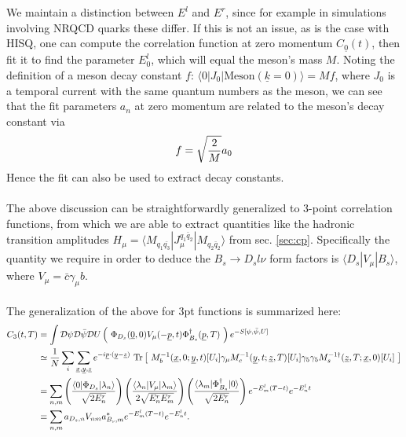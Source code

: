 \\ \\
We maintain a distinction between $E^l$ and $E^r$, since for example in simulations involving NRQCD quarks these differ. If this is not an issue, as is the case with HISQ, one can compute the correlation function at zero momentum $C_{\underline{0}}(t)$, then fit it to find the parameter $E^l_0$, which will equal the meson's mass $M$. Noting the definition of a meson decay constant $f$: $\langle 0 | J_0 | \text{Meson}(\underline{k}=0) \rangle = M f$, where $J_0$ is a temporal current with the same quantum numbers as the meson, we can see that the fit parameters $a_n$ at zero momentum are related to the meson's decay constant via
\begin{align}
	f = \sqrt{2\over M} a_0
\end{align}
Hence the fit can also be used to extract decay constants.
\\ \\
The above discussion can be straightforwardly generalized to 3-point correlation functions, from which we are able to extract quantities like the hadronic transition amplitudes $H_{\mu} = \langle M_{q_1\bar{q_3}} | J_{\mu}^{q_1\bar{q}_2} | M_{q_2\bar{q}_2} \rangle$ from sec. \ref{sec:cp}. Specifically the quantity we require in order to deduce the $B_{s}\to D_{s} l\nu$ form factors is $\langle D_{s} | V_{\mu} | B_{s} \rangle$, where $V_{\mu}=\bar{c}\gamma_{\mu} b$. 
\\ \\
The generalization of the above for 3pt functions is summarized here:
\begin{align}
	C_3(t,T) &= \int \mathcal{D}\psi \mathcal{D}\bar{\psi} \mathcal{D}U \left(\text{ } \Phi_{D_s}(\underline{0},0) V_{\mu}(-\underline{p},t) \Phi_{B_s}^{\dagger}(\underline{p},T) \text{ }\right) e^{-S[\psi,\bar{\psi},U]} \\
	&\simeq {1\over N} \sum_i \sum_{\underline{x},\underline{y},\underline{z}} e^{-i\underline{p}\cdot (\underline{y}-\underline{z})} \text{ Tr}\left[\text{ } M^{-1}_b(\underline{x},0;\underline{y},t)[U_i] \gamma_{\mu} M^{-1}_c(\underline{y},t;\underline{z},T)[U_i]\gamma_5\gamma_5 M_s^{-1\dagger}(\underline{z},T;\underline{x},0)[U_i]  \text{ }\right] \\	
	&= \sum_{n,m}  \left( {\langle 0 | \Phi_{D_s} | \lambda_n \rangle \over \sqrt{2E^r_n}} \right) \left({\langle \lambda_n | V_{\mu} | \lambda_m \rangle \over 2\sqrt{ E^r_n E^r_m } }\right) \left( {\langle \lambda_m | \Phi_{B_s}^{\dagger} | 0 \rangle \over \sqrt{2E^r_n} } \right) e^{-E^l_m (T-t)} e^{-E^l_n t} \\
	\nonumber
	& \equiv \sum_{n,m} a_{D_s,n} V_{nm} a^*_{B_s,m} e^{-E^l_m (T-t)} e^{-E^l_n t}.
	\label{eq:3ptfitfunction}
\end{align}
